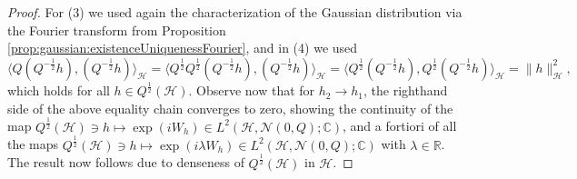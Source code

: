 \documentclass[10pt,a4paper]{amsart}
\newcommand{\C}{\mathbb{C}}
\newcommand{\Normal}{\mathcal{N}}
\newcommand{\R}{\mathbb{R}}
\newcommand{\hs}[1]{\mathcal{#1}} %
\newcommand{\stpx}[1]{{(#1)}}
\begin{document}
\begin{proof}
For \stpx{3} we used again the characterization of the Gaussian distribution via the Fourier transform from Proposition \ref{prop:gaussian:existenceUniquenessFourier},
and in \stpx{4} we used
\begin{equation*}
    \langle Q(Q^{-\frac12}h),(Q^{-\frac12}h)\rangle_\hs{H}
    = \langle Q^\frac12Q^\frac12(Q^{-\frac12}h),(Q^{-\frac12}h)\rangle_\hs{H}
    = \langle Q^\frac12(Q^{-\frac12}h), Q^\frac12(Q^{-\frac12}h) \rangle_\hs{H}
    = \|h\|_\hs{H}^2,
\end{equation*}
which holds for all $h\in Q^{\frac12}(\hs{H})$.
Observe now that for $h_2\rightarrow h_1$, the righthand side of the above equality chain converges to zero, showing the continuity of the map 
$Q^{\frac12}(\hs{H})\ni h \mapsto \exp(i W_h) \in L^2(\hs{H},\Normal(0,Q);\C)$,
and a fortiori of all the maps
$Q^{\frac12}(\hs{H})\ni h \mapsto \exp(i \lambda W_h) \in L^2(\hs{H},\Normal(0,Q);\C)$
with $\lambda\in\R$.
The result now follows due to denseness of $Q^\frac12(\hs{H})$ in $\hs{H}$.
\end{proof}
\end{document}
